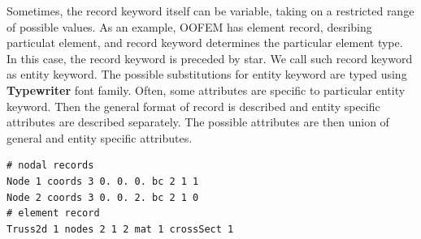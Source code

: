 \documentclass[a4paper]{article}
\newcommand{\entKeywordInst}[1]{\textbf{#1}} %
\begin{document}
Sometimes, the record keyword itself can be variable, taking on a restricted range of possible values.
As an example, OOFEM has element record, desribing particulat element, and record keyword determines the  particular element type.
In this case, the record keyword is preceded by star. We call such record keyword as entity keyword. The possible
substitutions for entity keyword are typed using \entKeywordInst{Typewriter} font family.
Often, some attributes are specific to particular entity keyword. Then the general format of record is described and entity specific attributes are described separately. The possible attributes are then union of general and entity specific attributes.

\begin{lstlisting}[style=oofem, language=oofeminput, caption={Example of input records}]
# nodal records
Node 1 coords 3 0. 0. 0. bc 2 1 1
Node 2 coords 3 0. 0. 2. bc 2 1 0 
# element record
Truss2d 1 nodes 2 1 2 mat 1 crossSect 1
\end{lstlisting}
\end{document}
